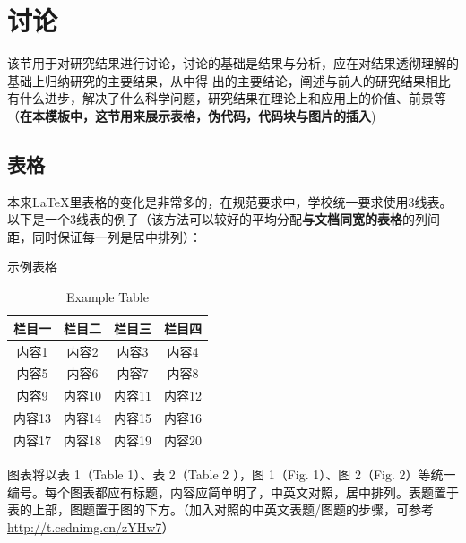 \section{讨论}该节用于对研究结果进行讨论，讨论的基础是结果与分析，应在对结果透彻理解的基础上归纳研究的主要结果，从中得
出的主要结论，阐述与前人的研究结果相比有什么进步，解决了什么科学问题，研究结果在理论上和应用上的价值、前景等（\textbf{在本模板中，这节用来展示表格，伪代码，代码块与图片的插入})

\subsection{表格}
\par 本来LaTeX里表格的变化是非常多的，在规范要求中，学校统一要求使用3线表。以下是一个3线表的例子（该方法可以较好的平均分配\textbf{与文档同宽的表格}的列间距，同时保证每一列是居中排列）：

\begin{table}[htbp] 
	\centering
	
	\caption{示例表格}
	
	\addtocounter{table}{-1}
	\vspace{-5pt}
	\renewcommand{\tablename}{Table}
	\caption{Example Table}
	
	\begin{spacing}{1.5}
		\begin{tabular*}{\textwidth}{@{\extracolsep{\fill}} cccc}
			\toprule
			栏目一 & 栏目二 & 栏目三 & 栏目四 \\
			\midrule
			内容1 & 内容2 & 内容3 & 内容4 \\
			内容5 & 内容6 & 内容7 & 内容8 \\
			内容9 & 内容10 & 内容11 & 内容12 \\
			内容13 & 内容14 & 内容15 & 内容16 \\
			内容17 & 内容18 & 内容19 & 内容20 \\
			\bottomrule
		\end{tabular*}
	\end{spacing}
\end{table}

\par 图表将以表 1（Table 1）、表 2（Table 2 ），图 1（Fig. 1）、图 2（Fig. 2）等统一编号。每个图表都应有标题，内容应简单明了，中英文对照，居中排列。表题置于表的上部，图题置于图的下方。（加入对照的中英文表题/图题的步骤，可参考\url{http://t.csdnimg.cn/zYHw7}）

